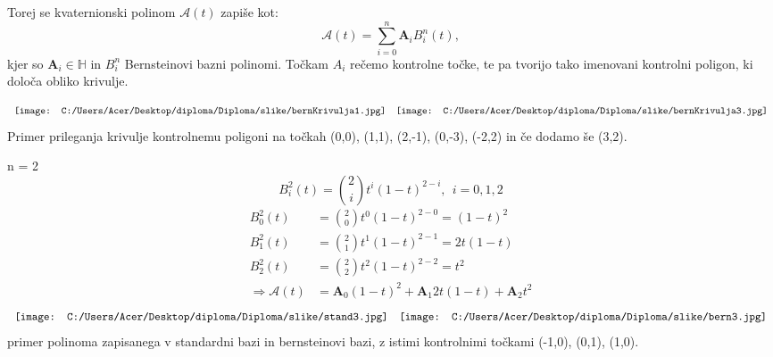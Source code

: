 \documentclass[mat1]{fmfdelo}
\newcommand{\HH}{\mathbb H}
\newcommand{\A}{\mathcal A}
\begin{document}
Torej se kvaternionski polinom $\A(t)$ zapiše kot:
\begin{equation*}
\A(t) = \sum_{i=0}^n \boldsymbol{A}_i B_i^n(t),
\end{equation*}
kjer so $\boldsymbol{A}_i \in \HH$ in $B_i^n$ Bernsteinovi bazni polinomi. Točkam $A_i$ rečemo kontrolne točke, te pa tvorijo tako imenovani kontrolni poligon, ki določa obliko krivulje.

\begin{equation*}
\begin{array}{c c}
\texttt{[image: C:/Users/Acer/Desktop/diploma/Diploma/slike/bernKrivulja1.jpg]} &
\texttt{[image: C:/Users/Acer/Desktop/diploma/Diploma/slike/bernKrivulja3.jpg]}
\end{array}
\end{equation*}
Primer prileganja krivulje kontrolnemu poligoni na točkah (0,0), (1,1), (2,-1), (0,-3), (-2,2) in če dodamo še (3,2).

\begin{primer}
n = 2
\begin{equation*}
B_i^2(t) = \binom{2}{i} t^i(1-t)^{2-i}, ~~ i=0,1,2
\end{equation*}
\begin{equation*}
\begin{split}
B_0^2(t) &= \binom{2}{0} t^0(1-t)^{2-0} = (1-t)^2\\
B_1^2(t) &= \binom{2}{1} t^1(1-t)^{2-1} = 2t(1-t)\\
B_2^2(t) &= \binom{2}{2} t^2(1-t)^{2-2} = t^2\\
\Longrightarrow \A(t) &= \boldsymbol{A}_0(1-t)^2 + \boldsymbol{A}_1 2t(1-t) + \boldsymbol{A}_2t^2
\end{split}
\end{equation*}
\begin{equation*}
\begin{array}{c c}
\texttt{[image: C:/Users/Acer/Desktop/diploma/Diploma/slike/stand3.jpg]} &
\texttt{[image: C:/Users/Acer/Desktop/diploma/Diploma/slike/bern3.jpg]}
\end{array}
\end{equation*}
primer polinoma zapisanega v standardni bazi in bernsteinovi bazi, z istimi kontrolnimi točkami (-1,0), (0,1), (1,0).
\end{primer}
\end{document}
